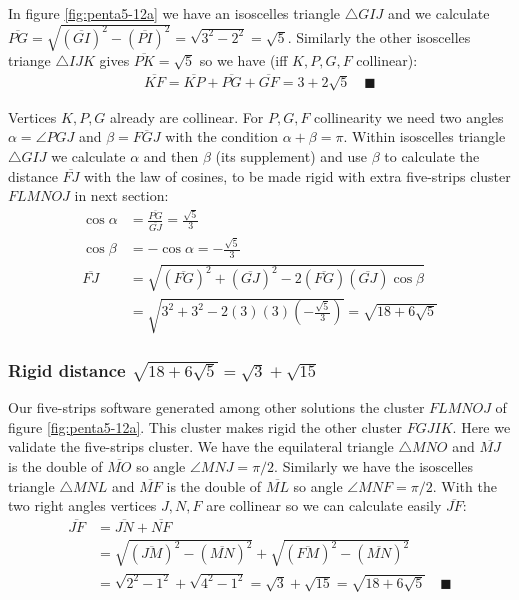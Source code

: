 \documentclass[11pt]{article}
\begin{document}
In figure \ref{fig:penta5-12a} we have an isoscelles triangle $\triangle{GIJ}$ and we calculate $\overline{PG} = \sqrt{(\overline{GI})^2 - (\overline{PI})^2} = \sqrt{3^2 - 2^2} = \sqrt5$. Similarly the other isoscelles triange $\triangle{IJK}$ gives $\overline{PK} = \sqrt{5}$ so we have (iff $K,P,G,F$ collinear):
\begin{align}
\overline{KF} = \overline{KP} + \overline{PG} + \overline{GF} = 3 + 2\sqrt5 \quad \blacksquare
\end{align}

Vertices $K,P,G$ already are collinear. For $P,G,F$ collinearity we need two angles $\alpha = \angle{PGJ}$ and $\beta = \overline{FGJ}$ with the condition $\alpha + \beta = \pi$. Within isoscelles triangle $\triangle{GIJ}$ we calculate $\alpha$ and then $\beta$ (its supplement) and use $\beta$ to calculate the distance $\overline{FJ}$ with the law of cosines, to be made rigid with extra five-strips cluster $FLMNOJ$ in next section:
\begin{align}
\cos\alpha &= \frac{\overline{PG}}{\overline{GJ}} = \frac{\sqrt5}3 \\
\cos\beta &= -\cos\alpha = -\frac{\sqrt5}3 \\
\overline{FJ} &= \sqrt{(\overline{FG})^2 + (\overline{GJ})^2
 - 2(\overline{FG})(\overline{GJ})\cos\beta} \nonumber\\
 &= \sqrt{3^2 + 3^2 - 2(3)(3)\left(-\frac{\sqrt5}3\right)}
 = \sqrt{18 + 6\sqrt5}
\end{align}


\subsubsection{Rigid distance $\sqrt{18+6\sqrt5} = \sqrt3 + \sqrt{15}$}

Our five-strips software generated among other solutions the cluster $FLMNOJ$ of figure \ref{fig:penta5-12a}. This cluster makes rigid the other cluster $FGJIK$. Here we validate the five-strips cluster. We have the equilateral triangle $\triangle{MNO}$ and $\overline{MJ}$ is the double of $\overline{MO}$ so angle $\angle{MNJ} = \pi/2$. Similarly we have the isoscelles triangle $\triangle{MNL}$ and $\overline{MF}$ is the double of $\overline{ML}$ so angle $\angle{MNF} = \pi/2$. With the two right angles vertices $J,N,F$ are collinear so we can calculate easily $\overline{JF}$:
\begin{align}
\overline{JF} &= \overline{JN} + \overline{NF} \nonumber\\
 &= \sqrt{(\overline{JM})^2 - (\overline{MN})^2} 
  + \sqrt{(\overline{FM})^2 - (\overline{MN})^2} \nonumber\\
 &= \sqrt{2^2 - 1^2} + \sqrt{4^2 - 1^2} = \sqrt{3} + \sqrt{15} 
 = \sqrt{18 + 6\sqrt5} \quad \blacksquare
\end{align}
\end{document}
